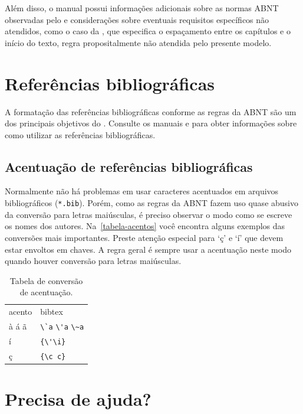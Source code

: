 Além disso, o manual possui informações adicionais sobre as normas ABNT
observadas pelo \abnTeX{} e considerações sobre eventuais requisitos específicos
não atendidos, como o caso da \textcite[seção 5.2.2]{NBR14724:2011}, que
especifica o espaçamento entre os capítulos e o início do texto, regra
propositalmente não atendida pelo presente modelo.

\section{Referências bibliográficas}

A formatação das referências bibliográficas conforme as regras da ABNT são um
dos principais objetivos do \abnTeX{}. Consulte os manuais
\textcite{abntex2cite} e \textcite{abntex2cite-alf} para obter informações
sobre como utilizar as referências bibliográficas.

\subsection{Acentuação de referências bibliográficas}

Normalmente não há problemas em usar caracteres acentuados em arquivos
bibliográficos (\texttt{*.bib}). Porém, como as regras da ABNT fazem uso quase
abusivo da conversão para letras maiúsculas, é preciso observar o modo como se
escreve os nomes dos autores. Na~\autoref{tabela-acentos} você encontra alguns
exemplos das conversões mais importantes. Preste atenção especial para `ç' e `í'
que devem estar envoltos em chaves. A regra geral é sempre usar a acentuação
neste modo quando houver conversão para letras maiúsculas.

\begin{table}[htbp]
  \caption[Tabela de conversão de acentuação]
  {Tabela de conversão de acentuação.}%
  \label{tabela-acentos}
  \centering
  \begin{tabular}{ll}
  \toprule
  acento & \textsf{bibtex}\\
  à á ã & \verb+\`a+ \verb+\'a+ \verb+\~a+\\
  í & \verb+{\'\i}+\\
  ç & \verb+{\c c}+\\
  \bottomrule
  \end{tabular}
\end{table}

\section{Precisa de ajuda?}

